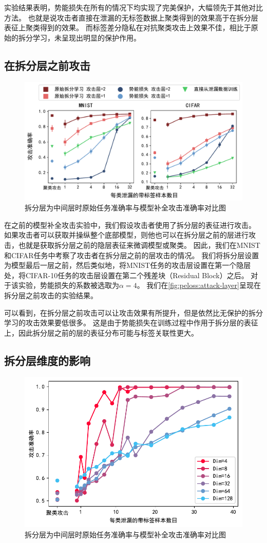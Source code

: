 %
实验结果表明，势能损失在所有的情况下均实现了完美保护，大幅领先于其他对比方法。
也就是说攻击者直接在泄漏的无标签数据上聚类得到的效果高于在拆分层表征上聚类得到的效果。
%
而标签差分隐私在对抗聚类攻击上效果不佳，相比于原始的拆分学习，未呈现出明显的保护作用。


\subsection{在拆分层之前攻击}
\begin{figure}[h!]
    \centering
    \includegraphics[width=0.7\linewidth]{Z_Resources/peloss_attack-layer}
    \caption{拆分层为中间层时原始任务准确率与模型补全攻击准确率对比图}
    \label{fig:peloss:attack-layer}
\end{figure}

在之前的模型补全攻击实验中，我们假设攻击者使用了拆分层的表征进行攻击。
如果攻击者可以获取并操纵整个底部模型，则他也可以在拆分层之前的层进行攻击，也就是获取拆分层之前的隐层表征来微调模型或聚类。
%
因此，我们在MNIST和CIFAR任务中考察了攻击者在拆分层之前的层攻击的情况。
我们将拆分层设置为模型最后一层之前，然后类似地，将MNIST任务的攻击层设置在第一个隐层处，将CIFAR-10任务的攻击层设置在第二个残差块（Residual Block）之后。
%
对于该实验，势能损失的系数被选取为$\alpha=4$。
%
我们在\autoref{fig:peloss:attack-layer}呈现在拆分层之前攻击的实验结果。

可以看到，在拆分层之前攻击可以让攻击效果有所提升，但是依然比无保护的拆分学习的攻击效果要低很多。
%
这是由于势能损失在训练过程中作用于拆分层的表征上，因此拆分层之前的层的表征分布可能与标签关联性更大。

\subsection{拆分层维度的影响}
\begin{figure}[h!]
    \centering
    \includegraphics[width=0.7\linewidth]{Z_Resources/peloss_mnist-subclass2}
    \caption{拆分层为中间层时原始任务准确率与模型补全攻击准确率对比图}
    \label{fig:peloss:bottom_dim}
\end{figure}

